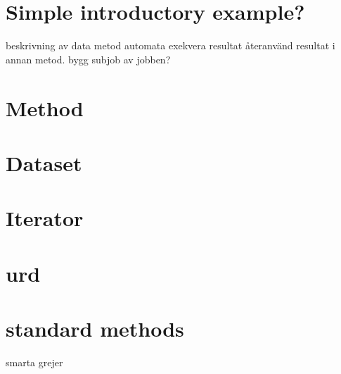 \documentclass[a4paper]{report}
\begin{document}
\chapter{Simple introductory example?}
beskrivning av data
metod
automata
exekvera
resultat
återanvänd resultat i annan metod.
bygg subjob av jobben?

\chapter{Method}


\chapter{Dataset}



\chapter{Iterator}


\chapter{urd}



\chapter{standard methods}


%
%




%


%


smarta grejer



\end{document}
